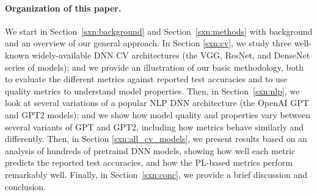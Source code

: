 \paragraph{Organization of this paper.}

We start in Section~\ref{sxn:background} and Section~\ref{sxn:methods} with background and an overview of our general approach.
In Section \ref{sxn:cv}, we study three well-known widely-available DNN CV architectures (the VGG, ResNet, and DenseNet series of models); and we provide an illustration of our basic methodology, both to evaluate the different metrics against reported test accuracies and to use quality metrics to understand model properties.
Then, in Section~\ref{sxn:nlp}, we look at several variations of a popular NLP DNN architecture (the OpenAI GPT and GPT2 models); and we show how model quality and properties vary between several variants of GPT and GPT2, including how metrics behave similarly and differently.
Then, in Section \ref{sxn:all_cv_models}, we present results based on an analysis of hundreds of pretraind DNN models, showing how well each metric predicts the reported test accuracies, and how the PL-based metrics perform remarkably well.
Finally, in Section~\ref{sxn:conc}, we provide a brief discussion and conclusion.



